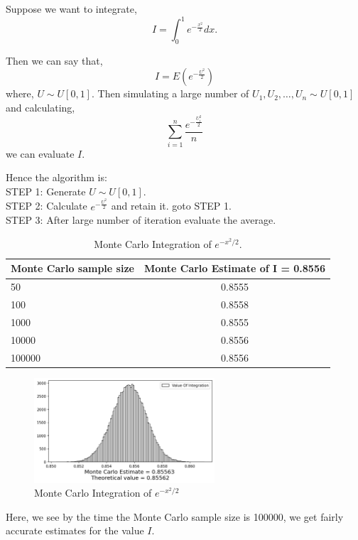 \begin{example}
	Suppose we want to integrate,
	\[
		I = \int_{0}^{1} e^{-\frac{x ^{2}}{2}} dx.
	\]

	Then we can say that,
	\[
		I = E(e^{-\frac{U ^{2}}{2}})
	\]
	where, $U\sim U[0,1]$. Then simulating a large number of $U_1, U_2, \ldots, U_n\sim U[0,1]$ and calculating,
	\[
		\sum_{i = 1}^{n}  \frac{e^{-\frac{U_i ^{2}}{2}}}{n}
	\]
	we can evaluate $I$.

	Hence the algorithm is:\\
	STEP 1: Generate $U\sim U[0,1]$. \\
	STEP 2: Calculate $ e^{-\frac{U ^{2}}{2}} $ and retain it. goto STEP 1. \\
	STEP 3: After large number of iteration evaluate the average.
	\begin{table}[H]
		\begin{center}
			\begin{tabular}{l c}
				\hline
				Monte Carlo sample size & Monte Carlo Estimate of I = 0.8556 \\
				\hline
				50                      & 0.8555                              \\
				100                     & 0.8558                              \\
				1000                    & 0.8555                              \\
				10000                   & 0.8556                              \\
				100000                  & 0.8556                              \\
				\hline
			\end{tabular}
			\caption{Monte Carlo Integration of $e^{-x ^{2}/2}$.}
		\end{center}
	\end{table}
	\begin{figure}[H]
		\centering
		\includegraphics[width=0.6\textwidth]{images/evaluating_integration.png}
		\caption{Monte Carlo Integration of $e^{-x ^{2}/2} $}
	\end{figure}
	Here, we see by the time the Monte Carlo sample size is 100000, we get fairly
	accurate estimates for the value $I$.
\end{example}


